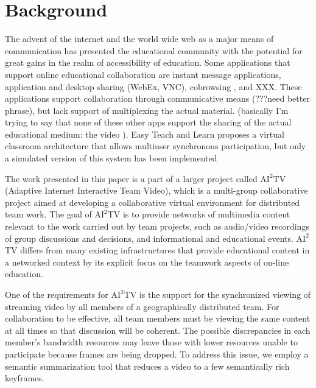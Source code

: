 \documentclass{sig-alternate}
\begin{document}
\section{Background} \label{background}
The advent of the internet and the world wide web as a major means of
communication has presented the educational community with the
potential for great gains in the realm of accessibility of education.
Some applications that support online educational collaboration are
instant message applications, application and desktop sharing (WebEx,
VNC), cobrowsing \cite{CAPPS, LIEBERMAN, SIDLER}, and XXX.  These
applications support collaboration through communicative means
(???need better phrase), but lack support of multiplexing the actual
material.  (basically I'm trying to say that none of these other apps
support the sharing of the actual educational medium: the video ).
Easy Teach and Learn proposes a virtual classroom architecture that
allows multiuser synchronous participation, but only a simulated
version of this system has been implemented \cite{WALTER}

The work presented in this paper is a part of a larger project called
$\mathrm{AI}^2$TV (Adaptive Internet Interactive Team Video), which is a
multi-group collaborative project aimed at developing a collaborative
virtual environment for distributed team work.  The goal of $\mathrm{AI}^2$TV is
to provide networks of multimedia content relevant to the work carried
out by team projects, such as audio/video recordings of group
discussions and decisions, and informational and educational events.
$\mathrm{AI}^2$TV differs from many existing infrastructures that provide
educational content in a networked context by its explicit focus on
the teamwork aspects of on-line education.


One of the requirements for $\mathrm{AI}^2$TV is the support for the
synchronized viewing of streaming video by all members of a
geographically distributed team.  For collaboration to be effective,
all team members must be viewing the same content at all times so that
discussion will be coherent.  The possible discrepancies in each
member's bandwidth resources may leave those with lower resources
unable to participate because frames are being dropped.  To address
this issue, we employ a semantic summarization tool \cite{TIECHENG}
that reduces a video to a few semantically rich keyframes.
\end{document}
